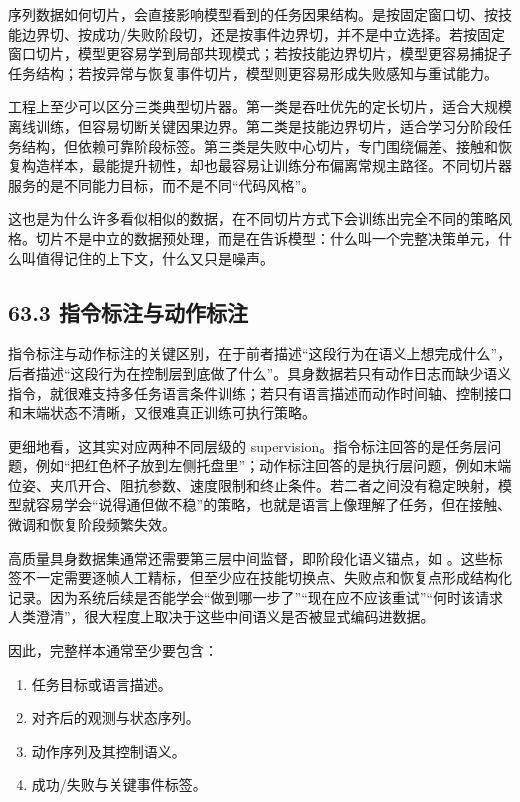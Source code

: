 序列数据如何切片，会直接影响模型看到的任务因果结构。是按固定窗口切、按技能边界切、按成功/失败阶段切，还是按事件边界切，并不是中立选择。若按固定窗口切片，模型更容易学到局部共现模式；若按技能边界切片，模型更容易捕捉子任务结构；若按异常与恢复事件切片，模型则更容易形成失败感知与重试能力。

工程上至少可以区分三类典型切片器。第一类是吞吐优先的定长切片，适合大规模离线训练，但容易切断关键因果边界。第二类是技能边界切片，适合学习分阶段任务结构，但依赖可靠阶段标签。第三类是失败中心切片，专门围绕偏差、接触和恢复构造样本，最能提升韧性，却也最容易让训练分布偏离常规主路径。不同切片器服务的是不同能力目标，而不是不同“代码风格”。

这也是为什么许多看似相似的数据，在不同切片方式下会训练出完全不同的策略风格。切片不是中立的数据预处理，而是在告诉模型：什么叫一个完整决策单元，什么叫值得记住的上下文，什么又只是噪声。

\subsection*{63.3 指令标注与动作标注}


指令标注与动作标注的关键区别，在于前者描述“这段行为在语义上想完成什么”，后者描述“这段行为在控制层到底做了什么”。具身数据若只有动作日志而缺少语义指令，就很难支持多任务语言条件训练；若只有语言描述而动作时间轴、控制接口和末端状态不清晰，又很难真正训练可执行策略。

更细地看，这其实对应两种不同层级的 supervision。指令标注回答的是任务层问题，例如“把红色杯子放到左侧托盘里”；动作标注回答的是执行层问题，例如末端位姿、夹爪开合、阻抗参数、速度限制和终止条件。若二者之间没有稳定映射，模型就容易学会“说得通但做不稳”的策略，也就是语言上像理解了任务，但在接触、微调和恢复阶段频繁失效。

高质量具身数据集通常还需要第三层中间监督，即阶段化语义锚点，如 \texttt{}。这些标签不一定需要逐帧人工精标，但至少应在技能切换点、失败点和恢复点形成结构化记录。因为系统后续是否能学会“做到哪一步了”“现在应不应该重试”“何时该请求人类澄清”，很大程度上取决于这些中间语义是否被显式编码进数据。

因此，完整样本通常至少要包含：

\begin{enumerate}
\item 任务目标或语言描述。
\item 对齐后的观测与状态序列。
\item 动作序列及其控制语义。
\item 成功/失败与关键事件标签。
\end{enumerate}

